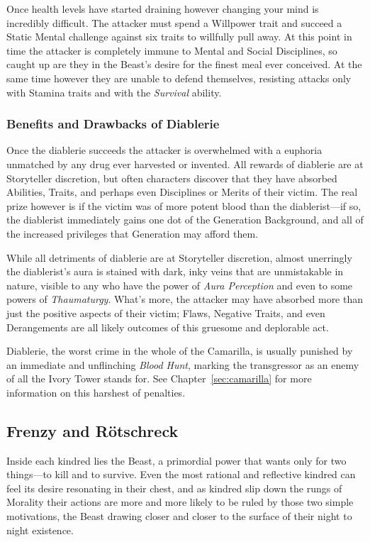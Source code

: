 Once health levels have started draining however changing your mind is incredibly difficult.  
The attacker must spend a Willpower trait and succeed a Static Mental challenge against 
six traits to willfully pull away.  At this point in time the attacker is completely immune 
to Mental and Social Disciplines, so caught up are they in the Beast's desire for the finest 
meal ever conceived.  At the same time however they are unable to defend themselves, resisting 
attacks only with Stamina traits and with the \emph{Survival} ability.

\subsubsection{Benefits and Drawbacks of Diablerie}
Once the diablerie succeeds the attacker is overwhelmed with a euphoria unmatched by any drug 
ever harvested or invented.  All rewards of diablerie are at Storyteller discretion, but often 
characters discover that they have absorbed Abilities, Traits, and perhaps even Disciplines or 
Merits of their victim.  The real prize however is if the victim was of more potent blood than 
the diablerist---if so, the diablerist immediately gains one dot of the Generation Background, 
and all of the increased privileges that Generation may afford them.

While all detriments of diablerie are at Storyteller discretion, almost unerringly the 
diablerist's aura is stained with dark, inky veins that are unmistakable in nature, visible 
to any who have the power of \emph{Aura Perception} and even to some powers of 
\emph{Thaumaturgy}.  What's more, the attacker may have absorbed more than just the positive 
aspects of their victim; Flaws, Negative Traits, and even Derangements are all likely outcomes 
of this gruesome and deplorable act.

Diablerie, the worst crime in the whole of the Camarilla, is usually punished by an immediate and 
unflinching \emph{Blood Hunt}, marking the transgressor as an enemy of all the Ivory Tower 
stands for.  See Chapter~\ref{sec:camarilla} for more information on this harshest of penalties.

\subsection{Frenzy and R\"{o}tschreck}
\label{subsec:frenzy}
Inside each kindred lies the Beast, a primordial power that wants only for two things---to kill 
and to survive.  Even the most rational and reflective kindred can feel its desire resonating in their 
chest, and as kindred slip down the rungs of Morality their actions are more and more likely to be 
ruled by those two simple motivations, the Beast drawing closer and closer to the surface of their night 
to night existence.

